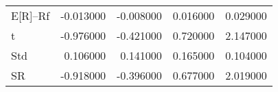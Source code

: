 \begin{tabular}{lrrrr}
\toprule
\midrule
E[R]--Rf & -0.013000 & -0.008000 & 0.016000 & 0.029000 \\
t & -0.976000 & -0.421000 & 0.720000 & 2.147000 \\
Std & 0.106000 & 0.141000 & 0.165000 & 0.104000 \\
SR & -0.918000 & -0.396000 & 0.677000 & 2.019000 \\
\bottomrule
\end{tabular}
